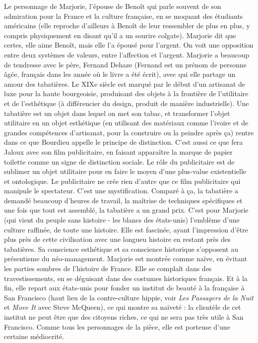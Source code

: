 \documentclass[a4paper,12pt]{book}
\begin{document}
\par Le personnage de Marjorie, l'épouse de Benoît qui parle souvent de son admiration pour la France et la culture française, en se moquant des étudiants américains (elle reproche d'ailleurs à Benoît de leur ressembler de plus en plus, y compris physiquement en disant qu'il a un sourire colgate). Marjorie dit que certes, elle aime Benoît, mais elle l'a épousé pour l'argent. On voit une opposition entre deux systèmes de valeurs, entre l'affection et l'argent. Marjorie a beaucoup de tendresse avec le père, Fernand Dehaze (Fernand est un prénom de personne âgée, français dans les année où le livre a été écrit), avec qui elle partage un amour des tabatières. Le XIXe siècle est marqué par le début d'un artisanat de luxe pour la haute bourgeoisie, produisant des objets à la frontière de l'utilitaire et de l'esthétique (à différencier du design, produit de manière industrielle). Une tabatière est un objet dans lequel on met son tabac, et transformer l'objet utilitaire en un objet esthétique (en utilisant des matériaux comme l'ivoire et de grandes compétences d'artisanat, pour la construire ou la peindre après ça) rentre dans ce que Bourdieu appelle le principe de distinction. C'est aussi ce que fera Jaloux avec son film publicitaire, en faisant apparaître la marque de papier toilette comme un signe de distinction sociale. Le rôle du publicitaire est de sublimer un objet utilitaire pour en faire le moyen d'une plus-value existentielle et ontologique. Le publicitaire ne crée rien d'autre que ce film publicitaire qui manipule le spectateur. C'est une mystification. Comparé à ça, la tabatière a demandé beaucoup d'heures de travail, la maîtrise de techniques spécifiques et une fois que tout est assemblé, la tabatière a un grand prix. C'est pour Marjorie (qui vient du peuple sans histoire - les blancs des états-unis) l'emblème d'une culture raffinée, de toute une histoire. Elle est fascinée, ayant l'impression d'être plus près de cette civilisation avec une longueu histoire en restant près des tabatières. Sa conscience esthétique et sa conscience historique s'opposent au présentisme du néo-management. Marjorie est montrée comme naïve, en évitant les parties sombres de l'histoire de France. Elle se complaît dans des travestissements, en se déguisant dans des costumes historiques français. Et à la fin, elle repart aux états-unis pour fonder un institut de beauté à la française à San Francisco (haut lieu de la contre-culture hippie, voir \textit{Les Passagers de la Nuit} et \textit{Move It} avec Steve McQueen), ce qui montre sa naïveté : la clientèle de cet institut ne peut être que des citoyens riches, ce qui ne sera pas très utile à San Francisco. Comme tous les personnages de la pièce, elle est porteuse d'une certaine médiocrité. 
\end{document}
